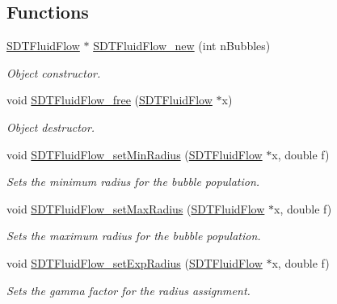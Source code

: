 \subsection*{Functions}
\begin{DoxyCompactItemize}
\item 
\hyperlink{group__fluidflow_ga2df6b1f85ce5d2b1dfb5943ef84cd132}{S\+D\+T\+Fluid\+Flow} $\ast$ \hyperlink{group__fluidflow_ga6d2b03d974e7ee6a5d0c45aab4baa5d3}{S\+D\+T\+Fluid\+Flow\+\_\+new} (int n\+Bubbles)
\begin{DoxyCompactList}\small\item\em Object constructor. \end{DoxyCompactList}\item 
void \hyperlink{group__fluidflow_ga5278f1f0a757874202d7e61b7da90b1e}{S\+D\+T\+Fluid\+Flow\+\_\+free} (\hyperlink{group__fluidflow_ga2df6b1f85ce5d2b1dfb5943ef84cd132}{S\+D\+T\+Fluid\+Flow} $\ast$x)
\begin{DoxyCompactList}\small\item\em Object destructor. \end{DoxyCompactList}\item 
void \hyperlink{group__fluidflow_ga3a76e68eb9e7af294fee95e98cdc002a}{S\+D\+T\+Fluid\+Flow\+\_\+set\+Min\+Radius} (\hyperlink{group__fluidflow_ga2df6b1f85ce5d2b1dfb5943ef84cd132}{S\+D\+T\+Fluid\+Flow} $\ast$x, double f)
\begin{DoxyCompactList}\small\item\em Sets the minimum radius for the bubble population. \end{DoxyCompactList}\item 
void \hyperlink{group__fluidflow_ga9bb67f45f1d78d87fcef214a30fc3ed8}{S\+D\+T\+Fluid\+Flow\+\_\+set\+Max\+Radius} (\hyperlink{group__fluidflow_ga2df6b1f85ce5d2b1dfb5943ef84cd132}{S\+D\+T\+Fluid\+Flow} $\ast$x, double f)
\begin{DoxyCompactList}\small\item\em Sets the maximum radius for the bubble population. \end{DoxyCompactList}\item 
void \hyperlink{group__fluidflow_ga4d9010f3830990fe1028047d8dd8fb4d}{S\+D\+T\+Fluid\+Flow\+\_\+set\+Exp\+Radius} (\hyperlink{group__fluidflow_ga2df6b1f85ce5d2b1dfb5943ef84cd132}{S\+D\+T\+Fluid\+Flow} $\ast$x, double f)
\begin{DoxyCompactList}\small\item\em Sets the gamma factor for the radius assignment. \end{DoxyCompactList}\item 

\end{DoxyCompactItemize}
